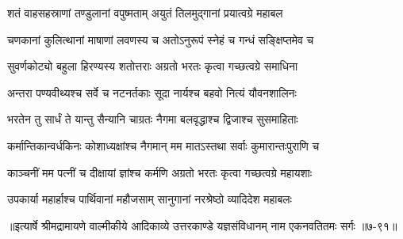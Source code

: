 \twolineshloka
{शतं वाहसहस्राणां तण्डुलानां वपुष्मताम्}
{अयुतं तिलमुद्गानां प्रयात्वग्रे महाबल} %

\twolineshloka
{चणकानां कुलित्थानां माषाणां लवणस्य च}
{अतोऽनुरूपं स्नेहं च गन्धं सङ्क्षिप्तमेव च} %

\twolineshloka
{सुवर्णकोट्यो बहुला हिरण्यस्य शतोत्तराः}
{अग्रतो भरतः कृत्वा गच्छत्वग्रे समाधिना} %

\twolineshloka
{अन्तरा पण्यवीथ्यश्च सर्वे च नटनर्तकाः}
{सूदा नार्यश्च बहवो नित्यं यौवनशालिनः} %

\twolineshloka
{भरतेन तु सार्धं ते यान्तु सैन्यानि चाग्रतः}
{नैगमा बलवृद्धाश्च द्विजाश्च सुसमाहिताः} %

\twolineshloka
{कर्मान्तिकान्वर्धकिनः कोशाध्यक्षांश्च नैगमान्}
{मम मातऽस्तथा सर्वाः कुमारान्तःपुराणि च} %

\twolineshloka
{काञ्चनीं मम पत्नीं च दीक्षायां ज्ञांश्च कर्मणि}
{अग्रतो भरतः कृत्वा गच्छत्वग्रे महायशाः} %

\twolineshloka
{उपकार्या महार्हाश्च पार्थिवानां महौजसाम्}
{सानुगानां नरश्रेष्ठो व्यादिदेश महाबलः} %


॥इत्यार्षे श्रीमद्रामायणे वाल्मीकीये आदिकाव्ये उत्तरकाण्डे यज्ञसंविधानम् नाम एकनवतितमः सर्गः ॥७-९१॥

